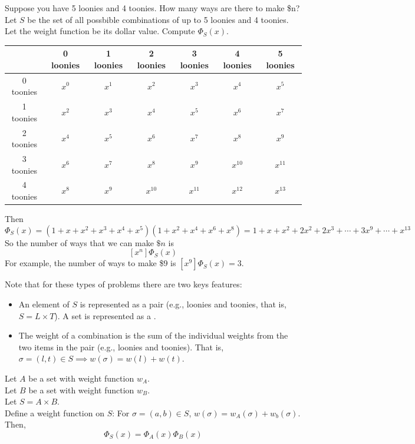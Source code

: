 \documentclass[english, 11pt]{article}
\begin{document}
   \begin{exmp}
     Suppose you have 5 loonies and 4 toonies. How many ways are there to make \$n? \\
     Let $S$ be the set of all possbible combinations of up to 5 loonies and 4 toonies. Let the weight function be its dollar value. Compute $\Phi_S(x)$. \\
 \begin{center}
     \begin{tabular}{c | c | c | c | c | c | c}
       & 0 loonies & 1 loonies & 2 loonies & 3 loonies & 4 loonies & 5 loonies \\
       \hline
       \hline
       0 toonies & $x^0$ & $x^1$ & $x^2$ & $x^3$ & $x^4$ & $x^5$ \\
       \hline
       1 toonies & $x^2$ & $x^3$ & $x^4$ & $x^5$ & $x^6$ & $x^7$ \\
       \hline
       2 toonies & $x^4$ & $x^5$ & $x^6$ & $x^7$ & $x^8$ & $x^9$ \\
       \hline
       3 toonies & $x^6$ & $x^7$ & $x^8$ & $x^9$ & $x^{10}$ & $x^{11}$ \\
       \hline
       4 toonies & $x^8$ & $x^9$ & $x^{10}$ & $x^{11}$ & $x^{12}$ & $x^{13}$ \\
       \hline
     \end{tabular}
\end{center}
     Then
     \[ \Phi_S(x) = (1+x+x^2+x^3+x^4+x^5)(1+x^2+x^4+x^6+x^8) =  1 + x + x^2 + 2x^2 + 2x^3 + \cdots + 3x^9 + \cdots + x^{13} \]
     So the number of ways that we can make $\$n$ is
     \[ [x^n]\Phi_S(x) \]
     For example, the number of ways to make \$9 is $[x^9]\Phi_S(x) = 3$.
   \end{exmp}

   \begin{rem}
   Note that for these types of problems there are two keys features:
   \begin{itemize}
     \item An element of $S$ is represented as a pair (e.g., loonies and toonies, that is, $S = L \times T$). A set is represented as a .
     \item The weight of a combination is the sum of the individual weights from the two items in the pair (e.g., loonies and toonies). That is, $\sigma = (l,t) \in S \implies w(\sigma) = w(l) + w(t)$.
   \end{itemize}
   \end{rem}

   \begin{lem}\label{product}
     Let $A$ be a set with weight function $w_A$. \\
     Let $B$ be a set with weight function $w_B$. \\
     Let $S = A \times B$. \\
     Define a weight function on $S$: For $\sigma = (a,b) \in S$, $w(\sigma) = w_A(\sigma) + w_b(\sigma)$. Then,
     \[ \Phi_S(x) = \Phi_A(x)\Phi_B(x) \]
   \end{lem}
\end{document}
